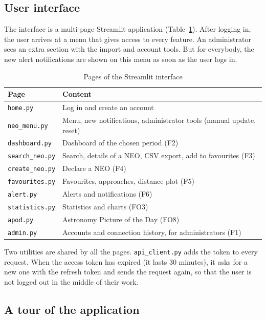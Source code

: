 \subsection{User interface}

The interface is a multi-page Streamlit application (Table~\ref{tab:pages}). After logging in,
the user arrives at a menu that gives access to every feature. An administrator sees an extra section
with the import and account tools. But for everybody, the new alert notifications are shown on this menu as soon as
the user logs in.

\begin{table}[H]
  \centering
  \small
  \begin{tabularx}{\textwidth}{@{}l>{\raggedright\arraybackslash}X@{}}
    \toprule
    \textbf{Page} & \textbf{Content} \\
    \midrule
    \texttt{home.py} & Log in and create an account \\
    \texttt{neo\_menu.py} & Menu, new notifications, administrator tools (manual update, reset) \\
    \texttt{dashboard.py} & Dashboard of the chosen period (F2) \\
    \texttt{search\_neo.py} & Search, details of a NEO, CSV export, add to favourites (F3) \\
    \texttt{create\_neo.py} & Declare a NEO (F4) \\
    \texttt{favourites.py} & Favourites, approaches, distance plot (F5) \\
    \texttt{alert.py} & Alerts and notifications (F6) \\
    \texttt{statistics.py} & Statistics and charts (FO3) \\
    \texttt{apod.py} & Astronomy Picture of the Day (FO8) \\
    \texttt{admin.py} & Accounts and connection history, for administrators (F1) \\
    \bottomrule
  \end{tabularx}
  \caption{Pages of the Streamlit interface}
  \label{tab:pages}
\end{table}

Two utilities are shared by all the pages. \texttt{api\_client.py} adds the token to every
request. When the access token has expired (it lasts 30 minutes), it asks for a new one with the
refresh token and sends the request again, so that the user is not logged out in the middle of
their work.

\subsection{A tour of the application}
\label{sec:tour}


